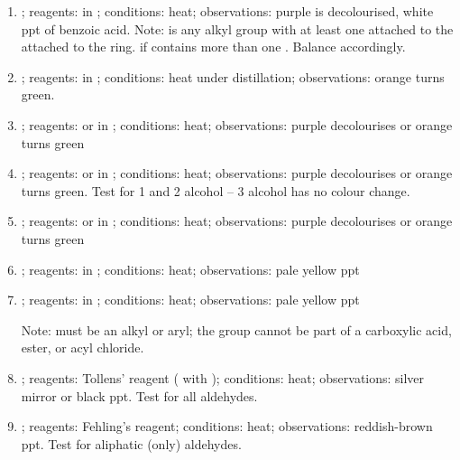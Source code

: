 \begin{enumerate}
    ; 
    \item {}; reagents:  in ; conditions: heat; observations: purple  is decolourised, white ppt of benzoic acid. Note:  is any alkyl group with at least one  attached to the  attached to the ring.  if  contains more than one . Balance accordingly.
    \item {}; reagents:  in ; conditions: heat under distillation; observations: orange  turns green.
    \item {}; reagents:  or  in ; conditions: heat; observations: purple  decolourises or orange  turns green
    \item {}; reagents:  or  in ; conditions: heat; observations: purple  decolourises or orange  turns green. Test for 1\SIUnitSymbolDegree{} and 2\SIUnitSymbolDegree{} alcohol -- 3\SIUnitSymbolDegree{} alcohol has no colour change.
    \item {}; reagents:  or  in ; conditions: heat; observations: purple  decolourises or orange  turns green
    \item {}; reagents:  in ; conditions: heat; observations: pale yellow ppt
    \item {}; reagents:  in ; conditions: heat; observations: pale yellow ppt
    
    Note:  must be an alkyl or aryl; the  group cannot be part of a carboxylic acid, ester, or acyl chloride.
    \item {}; reagents: Tollens' reagent ( with ); conditions: heat; observations: silver mirror or black ppt. Test for all aldehydes.
    \item {}; reagents: Fehling's reagent; conditions: heat; observations: reddish-brown ppt. Test for aliphatic (only) aldehydes.
\end{enumerate}
